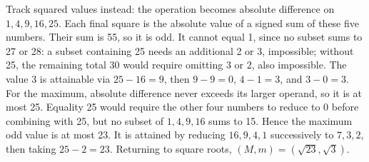 Track squared values instead: the operation becomes absolute difference on $ 1,4,9,16,25 $. Each final square is the absolute value of a signed sum of these five numbers. Their sum is 55, so it is odd. It cannot equal 1, since no subset sums to 27 or 28: a subset containing 25 needs an additional 2 or 3, impossible; without 25, the remaining total 30 would require omitting 3 or 2, also impossible. The value 3 is attainable via $ 25-16=9 $, then $ 9-9=0 $, $ 4-1=3 $, and $ 3-0=3 $. For the maximum, absolute difference never exceeds its larger operand, so it is at most 25. Equality 25 would require the other four numbers to reduce to 0 before combining with 25, but no subset of $ 1,4,9,16 $ sums to 15. Hence the maximum odd value is at most 23. It is attained by reducing $ 16,9,4,1 $ successively to $ 7,3,2 $, then taking $ 25-2=23 $. Returning to square roots, $\boxed{(M,m)=(\sqrt{23},\sqrt3)}$.
